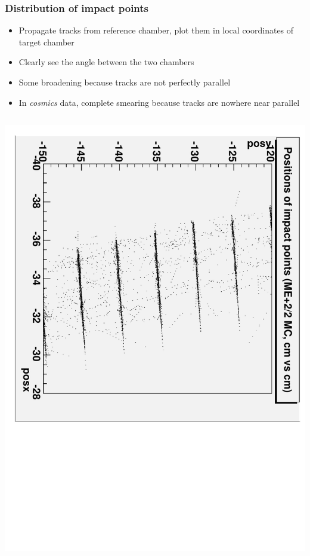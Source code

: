 \documentclass[compress]{beamer}
\begin{document}
\begin{frame}
\frametitle{Distribution of impact points}
\scriptsize
\begin{itemize}
\item Propagate tracks from reference chamber, plot them in local coordinates of target chamber
\item Clearly see the angle between the two chambers
\item Some broadening because tracks are not perfectly parallel
\item In {\it cosmics} data, complete smearing because tracks are nowhere near parallel
\end{itemize}

\vfill
\begin{columns}
\includegraphics[height=\linewidth, angle=90]{MC_positions_of_impact_points_detail.pdf}

\end{columns}
\end{frame}
\end{document}
